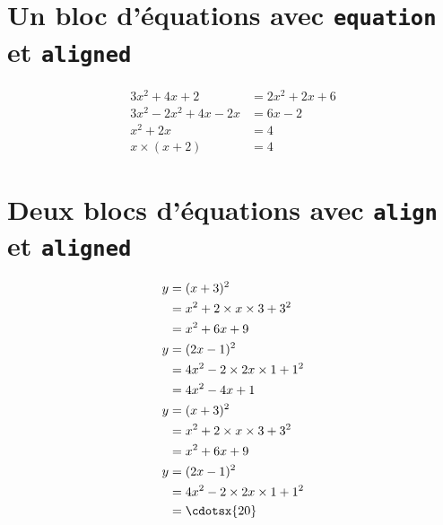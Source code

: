 \documentclass[11pt,a4paper]{article}
\begin{document}
\section{Un bloc d’équations avec \texttt{equation} et \texttt{aligned}}

\begin{equation*}
	\begin{aligned}
		      3x^2+4x+2 &= 2x^2+2x+6 \\
		3x^2-2x^2+4x-2x &= 6x-2 \\
		         x^2+2x &= 4 \\
		   x\times(x+2) &= 4
	\end{aligned}
\end{equation*}

\section{Deux blocs d’équations avec \texttt{align} et \texttt{aligned}}

\begin{align*}
	&\begin{aligned}%
		y&=(x+3)^2 \\
		 &=x^2+2\times x \times 3+3^2 \\
		 &=x^2+6x+9
	\end{aligned}
	\\%
	&\begin{aligned}%
		y&=(2x-1)^2 \\
		 &=4x^2-2\times 2x \times 1+1^2 \\
		 &=4x^2-4x+1
	\end{aligned}
	\\
	&\begin{aligned}%
		y&=(x+3)^2 \\
		 &=x^2+2\times x \times 3+3^2 \\
		 &=x^2+6x+9
	\end{aligned}
	\\%
	&\begin{aligned}%
		y&=(2x-1)^2 \\
		 &=4x^2-2\times 2x \times 1+1^2 \\
		 &=\cdotsx{20}
	\end{aligned}
\end{align*}

\anserdotline[2]

\anserline[2]
\end{document}
